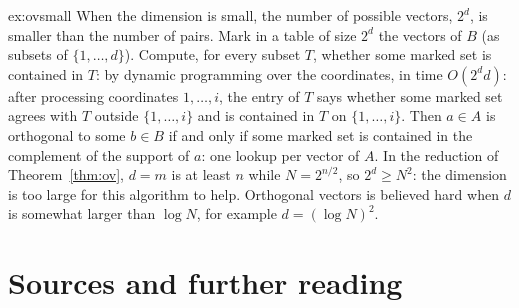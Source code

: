 \begin{solution}{ex:ovsmall}
\idea When the dimension is small, the number of possible vectors, $2^d$, is smaller than the number of pairs.
\writeup Mark in a table of size $2^d$ the vectors of $B$ (as subsets of $\{1,\dots,d\}$). Compute, for every subset $T$, whether some marked set is contained in $T$: by dynamic programming over the coordinates, in time $O(2^dd)$: after processing coordinates $1,\dots,i$, the entry of $T$ says whether some marked set agrees with $T$ outside $\{1,\dots,i\}$ and is contained in $T$ on $\{1,\dots,i\}$. Then $a\in A$ is orthogonal to some $b\in B$ if and only if some marked set is contained in the complement of the support of $a$: one lookup per vector of $A$. In the reduction of Theorem~\ref{thm:ov}, $d=m$ is at least $n$ while $N=2^{n/2}$, so $2^d\ge N^2$: the dimension is too large for this algorithm to help. Orthogonal vectors is believed hard when $d$ is somewhat larger than $\log N$, for example $d=(\log N)^2$.
\end{solution}

\section*{Sources and further reading}

